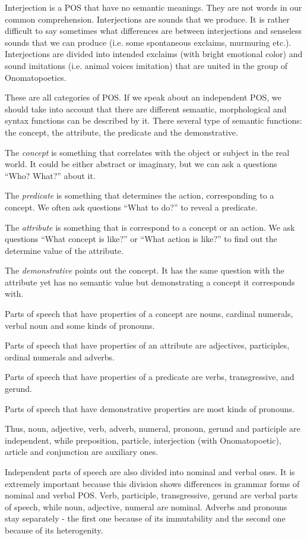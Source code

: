 Interjection is a POS that have no semantic meanings. They are not words in our common comprehension. Interjections are sounds that we produce. It is rather difficult to say sometimes what differences are between interjections and senseless sounds that we can produce (i.e. some spontaneous exclaims, murmuring etc.). Interjections are divided into intended exclaims (with bright emotional color) and sound imitations (i.e. animal voices imitation) that are united in the group of Onomatopoetics.

These are all categories of POS. If we speak about an independent POS, we should take into account that there are different semantic, morphological and syntax functions can be described by it. There several type of semantic functions: the concept, the attribute, the predicate and the demonstrative.

The \textit{concept} is something that correlates with the object or subject in the real world. It could be either abstract or imaginary, but we can ask a questions “Who? What?” about it.

The \textit{predicate} is something that determines the action, corresponding to a concept. We often ask questions “What to do?” to reveal a predicate.

The \textit{attribute} is something that is correspond to a concept or an action. We ask questions “What concept is like?” or “What action is like?” to find out the determine value of the attribute.

The \textit{demonstrative} points out the concept. It has the same question with the attribute yet has no semantic value but demonstrating a concept it corresponds with. 

Parts of speech that have properties of a concept are nouns, cardinal numerals, verbal noun and some kinds of pronouns.

Parts of speech that have properties of an attribute are adjectives, participles, ordinal numerals and adverbs.

Parts of speech that have properties of a predicate are verbs, transgressive, and gerund.

Parts of speech that have demonstrative properties are most kinds of pronouns.

Thus, noun, adjective, verb, adverb, numeral, pronoun, gerund and participle are independent, while preposition, particle, interjection (with Onomatopoetic), article and conjunction are auxiliary ones.

Independent parts of speech are also divided into nominal and verbal ones. It is extremely important because this division shows differences in grammar forms of nominal and verbal POS. Verb, participle, transgressive, gerund are verbal parts of speech, while noun, adjective, numeral are nominal. Adverbs and pronouns stay separately - the first one because of its immutability and the second one because of its heterogenity. 

